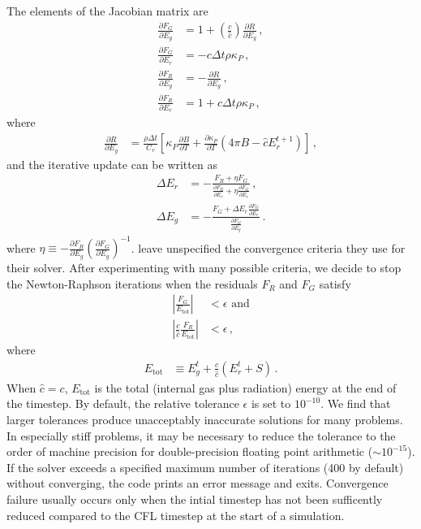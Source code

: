 \documentclass[fleqn,usenatbib]{mnras}
\begin{document}
The elements of the Jacobian matrix are
\begin{align}
\frac{\partial F_G}{\partial E_g} &= 1 + \left( \frac{c}{\hat c} \right) \frac{\partial R}{\partial E_g} \, , \\
\frac{\partial F_G}{\partial E_r} &= -c \Delta t \rho \kappa_P \, , \\
\frac{\partial F_R}{\partial E_g} &= -\frac{\partial R}{\partial E_g} \, , \\
\frac{\partial F_R}{\partial E_r} &= 1 + \hat c \Delta t \rho \kappa_P \, ,
\end{align}
where
\begin{align}
\frac{\partial R}{\partial E_g} &= \frac{\rho \Delta t}{C_v} \left[ \kappa_P \frac{\partial B}{\partial T} + \frac{\partial \kappa_P}{\partial T} \left( 4\pi B - \hat c E_r^{t+1} \right) \right] \, ,
\end{align}
and the iterative update can be written as
\begin{align}
\Delta E_r &= -\frac{F_R + \eta F_G}{ \frac{\partial F_R}{\partial E_r} + \eta \frac{\partial F_G}{\partial E_r} } \, , \\ 
\Delta E_g &= -\frac{F_G + \Delta E_r \frac{\partial F_G}{\partial E_r}}{ \frac{\partial F_G}{\partial E_g} } \, .
\end{align}
where $\eta \equiv - \frac{\partial F_R}{\partial E_g} \left( \frac{\partial F_G}{\partial E_g} \right)^{-1}$.
\cite{Howell_2003} leave unspecified the convergence criteria they use for their solver. After experimenting with many possible criteria, we decide to stop the Newton-Raphson iterations when the residuals $F_R$ and $F_G$ satisfy
\begin{align}
\left| \frac{F_G}{E_{\text{tot}}} \right| &< \epsilon \, \, \text{and} \\
\left| \frac{c}{\hat c} \frac{F_R}{E_{\text{tot}}} \right| &< \epsilon \, ,
\end{align}
where
\begin{align}
E_{\text{tot}} &\equiv E_g^t + \frac{c}{\hat c} \left( E_r^t + S \right) \, .
\end{align}
When $\hat c = c$, $E_{\text{tot}}$ is the total (internal gas plus radiation) energy at the end of the timestep. By default, the relative tolerance $\epsilon$ is set to $10^{-10}$. We find that larger tolerances produce unacceptably inaccurate solutions for many problems. In especially stiff problems, it may be necessary to reduce the tolerance to the order of machine precision for double-precision floating point arithmetic ($\sim 10^{-15}$). If the solver exceeds a specified maximum number of iterations (400 by default) without converging, the code prints an error message and exits. Convergence failure usually occurs only when the intial timestep has not been sufficently reduced compared to the CFL timestep at the start of a simulation.
\end{document}
